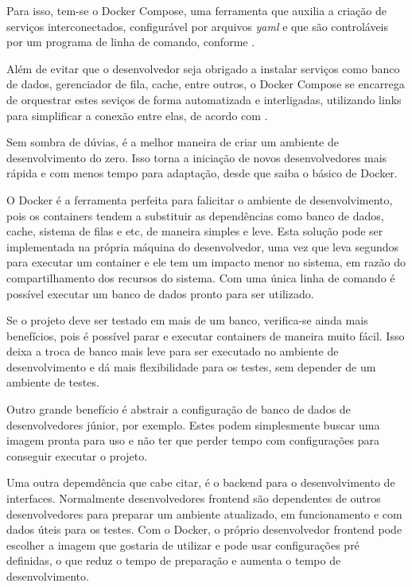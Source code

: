 \documentclass[
	12pt,				%
	openright,			%
	oneside,			%
	a4paper,			%
	chapter=TITLE,		%
	section=TITLE,		%
	english,			%
	french,				%
	spanish,			%
	brazil				%
	]{abntex2}
\begin{document}
Para isso, tem-se o Docker Compose, uma ferramenta que auxilia a criação de serviços interconectados, configurável por arquivos \textit{yaml} e que são controláveis por um programa de linha de comando, conforme .

Além de evitar que o desenvolvedor seja obrigado a instalar serviços como banco de dados, gerenciador de fila, cache, entre outros, o Docker Compose se encarrega de orquestrar estes seviços de forma automatizada e interligadas, utilizando links para simplificar a conexão entre elas, de acordo com .

Sem sombra de dúvias, é a melhor maneira de criar um ambiente de desenvolvimento do zero. Isso torna a iniciação de novos desenvolvedores mais rápida e com menos tempo para adaptação, desde que saiba o básico de Docker.

O Docker é a ferramenta perfeita para falicitar o ambiente de desenvolvimento, pois os containers tendem a substituir as dependências como banco de dados, cache, sistema de filas e etc, de maneira simples e leve. Esta solução pode ser implementada na própria máquina do desenvolvedor, uma vez que leva segundos para executar um container e ele tem um impacto menor no sistema, em razão do compartilhamento dos recursos do sistema. Com uma única linha de comando é possível executar um banco de dados pronto para ser utilizado.

Se o projeto deve ser testado em mais de um banco, verifica-se ainda mais benefícios, pois é possível parar e executar containers de maneira muito fácil. Isso deixa a troca de banco mais leve para ser executado no ambiente de desenvolvimento e dá mais flexibilidade para os testes, sem depender de um ambiente de testes.

Outro grande benefício é abstrair a configuração de banco de dados de desenvolvedores júnior, por exemplo. Estes podem simplesmente buscar uma imagem pronta para uso e não ter que perder tempo com configurações para conseguir executar o projeto.

Uma outra depemdência que cabe citar, é o backend para o desenvolvimento de interfaces. Normalmente desenvolvedores frontend são dependentes de outros desenvolvedores para preparar um ambiente atualizado, em funcionamento e com dados úteis para os testes. Com o Docker, o próprio desenvolvedor frontend pode escolher a imagem que gostaria de utilizar e pode usar configurações pré definidas, o que reduz o tempo de preparação e aumenta o tempo de desenvolvimento.
\end{document}

